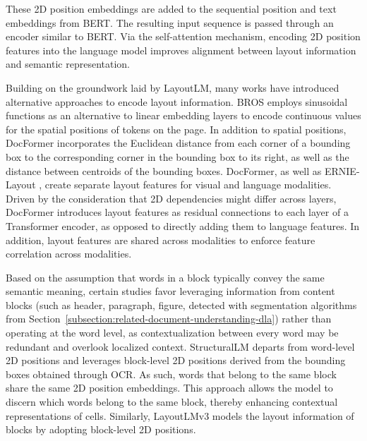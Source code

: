 \noindent These 2D position embeddings are added to the sequential position and text embeddings from \ac{BERT}. The resulting input sequence is passed through an encoder similar to \ac{BERT}. Via the self-attention mechanism, encoding 2D position features into the language model improves alignment between layout information and semantic representation. 

Building on the groundwork laid by LayoutLM, many works have introduced alternative approaches to encode layout information. BROS \citep{hong2020bros} employs sinusoidal functions as an alternative to linear embedding layers to encode continuous values for the spatial positions of tokens on the page. In addition to spatial positions, DocFormer \citep{appalaraju2021docformer} incorporates the Euclidean distance from each corner of a bounding box to the corresponding corner in the bounding box to its right, as well as the distance between centroids of the bounding boxes. DocFormer, as well as ERNIE-Layout \citep{peng2022ernie}, create separate layout features for visual and language modalities. Driven by the consideration that 2D dependencies might differ across layers, DocFormer introduces layout features as residual connections to each layer of a Transformer encoder, as opposed to directly adding them to language features. In addition, layout features are shared across modalities to enforce feature correlation across modalities. 

Based on the assumption that words in a block typically convey the same semantic meaning, certain studies favor leveraging information from content blocks (such as header, paragraph, figure, detected with segmentation algorithms from Section~\ref{subsection:related-document-understanding-dla}) rather than operating at the word level, as contextualization between every word may be redundant and overlook localized context. StructuralLM \citep{li2021structurallm} departs from word-level 2D positions and leverages block-level 2D positions derived from the bounding boxes obtained through \ac{OCR}. As such, words that belong to the same block share the same 2D position embeddings. This approach allows the model to discern which words belong to the same block, thereby enhancing contextual representations of cells. Similarly, LayoutLMv3 \citep{huang2022layoutlmv3} models the layout information of blocks by adopting block-level 2D positions.


